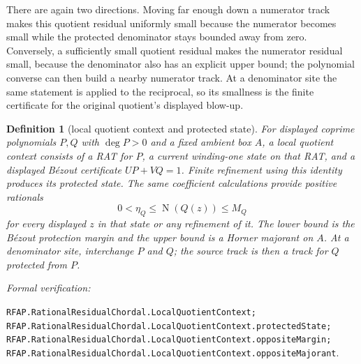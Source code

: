 \documentclass[11pt]{article}
\newtheorem{definition}[theorem]{Definition}
\newcommand{\Norm}[1]{\operatorname{N}\!\left(#1\right)}
\newcommand{\leanref}[1]{\par\smallskip\noindent
  \emph{Formal verification:}\par\nobreak
  {\raggedright\nolinkurl{#1}.\par}}
\begin{document}
There are again two directions.  Moving far enough down a numerator track
makes this quotient residual uniformly small because the numerator becomes
small while the protected denominator stays bounded away from zero.
Conversely, a sufficiently small quotient residual makes the numerator
residual small, because the denominator also has an explicit upper bound; the
polynomial converse can then build a nearby numerator track.  At a denominator
site the same statement is applied to the reciprocal, so its smallness is the
finite certificate for the original quotient's displayed blow-up.

\begin{definition}[local quotient context and protected state]
\label{def:protected-quotient-state}
For displayed coprime polynomials $P,Q$ with $\deg P>0$ and a fixed ambient
box $A$, a \emph{local quotient context} consists of a RAT for $P$, a current
winding-one state on that RAT, and a displayed Bézout certificate
$UP+VQ=1$.  Finite refinement using this identity produces its
\emph{protected state}.  The same coefficient calculations provide positive
rationals
\[
  0<\eta_Q\le\Norm{Q(z)}\le M_Q
\]
for every displayed $z$ in that state or any refinement of it.  The lower
bound is the Bézout protection margin and the upper bound is a Horner
majorant on $A$.  At a denominator site, interchange $P$ and $Q$; the source
track is then a track for $Q$ protected from $P$.
\end{definition}

\leanref{RFAP.RationalResidualChordal.LocalQuotientContext;
RFAP.RationalResidualChordal.LocalQuotientContext.protectedState;
RFAP.RationalResidualChordal.LocalQuotientContext.oppositeMargin;
RFAP.RationalResidualChordal.LocalQuotientContext.oppositeMajorant}
\end{document}
